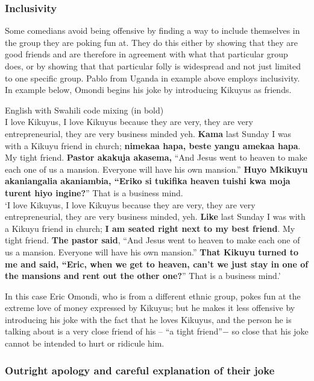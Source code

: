 \documentclass[output=paper]{langsci/langscibook}
\begin{document}
\subsubsection{Inclusivity }

Some comedians avoid being offensive by finding a way to include themselves in the group they are poking fun at. They do this either by showing that they are good friends and are therefore in agreement with what that particular group does, or by showing that that particular folly is widespread and not just limited to one specific group. Pablo from Uganda in example  above employs inclusivity. In example  below, Omondi begins his joke by introducing Kikuyus as friends. 

\ea\label{ex:muaka:14}
{English with Swahili code mixing (in bold)}\\
I love Kikuyus, I love Kikuyus because they are very, they are very entrepreneurial, they are very business minded yeh. \textbf{Kama} last Sunday I was with a Kikuyu friend in church; \textbf{nimekaa hapa, beste yangu amekaa hapa}. My tight friend. \textbf{Pastor akakuja akasema,} “And Jesus went to heaven to make each one of us a mansion. Everyone will have his own mansion.” \textbf{Huyo Mkikuyu akaniangalia akaniambia, “Eriko si tukifika heaven tuishi kwa moja turent hiyo ingine?}” That is a business mind. \\
\glt ‘I love Kikuyus, I love Kikuyus because they are very, they are very entrepreneurial, they are very business minded, yeh. \textbf{Like} last Sunday I was with a Kikuyu friend in church; \textbf{I am seated right next to my best friend}. My tight friend. \textbf{The pastor said}, “And Jesus went to heaven to make each one of us a mansion. Everyone will have his own mansion.” \textbf{That Kikuyu turned to me and said, “Eric, when we get to heaven, can’t we just stay in one of the mansions and rent out the other one?}” That is a business mind.’ \citep{Churchill2011}
\z

In this case Eric Omondi, who is from a different ethnic group, pokes fun at the extreme love of money expressed by Kikuyus; but he makes it less offensive by introducing his joke with the fact that he loves Kikuyus, and the person he is talking about is a very close friend of his – “a tight friend”$-$ so close that his joke cannot be intended to hurt or ridicule him.

\subsubsection{Outright apology and careful explanation of their joke }
\end{document}
